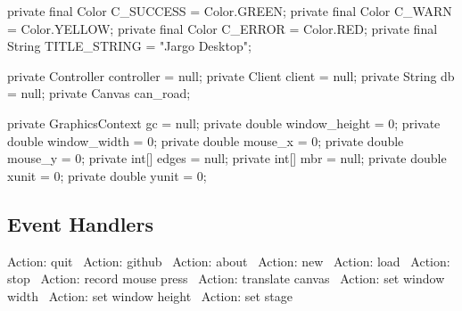 \documentclass{article}
\def\nwendcode{\endtrivlist \endgroup}      %
\let\nwdocspar=\par
\begin{document}
\nwenddocs{}\plusendmoddef
private final Color C_SUCCESS = Color.GREEN;
private final Color C_WARN = Color.YELLOW;
private final Color C_ERROR = Color.RED;
private final String TITLE_STRING = "Jargo Desktop";
\eatline
{}\nwendcode{}\nwdocspar
\nwenddocs{}\plusendmoddef
private Controller controller = null;
private Client client = null;
private String db = null;
private Canvas can_road;
\eatline
{}\nwendcode{}\nwdocspar
\nwenddocs{}\plusendmoddef
private GraphicsContext gc = null;
private double window_height = 0;
private double window_width = 0;
private double mouse_x = 0;
private double mouse_y = 0;
private int[] edges = null;
private int[] mbr = null;
private double xunit = 0;
private double yunit = 0;
\nwendcode{}\nwdocspar

\subsection{Event Handlers}
\nwenddocs{}\endmoddef{}
\LA{}Action: quit~{\nwtagstyle{}}\RA{}
\LA{}Action: github~{\nwtagstyle{}}\RA{}
\LA{}Action: about~{\nwtagstyle{}}\RA{}
\LA{}Action: new~{\nwtagstyle{}}\RA{}
\LA{}Action: load~{\nwtagstyle{}}\RA{}
\LA{}Action: stop~{\nwtagstyle{}}\RA{}
\LA{}Action: record mouse press~{\nwtagstyle{}}\RA{}
\LA{}Action: translate canvas~{\nwtagstyle{}}\RA{}
\LA{}Action: set window width~{\nwtagstyle{}}\RA{}
\LA{}Action: set window height~{\nwtagstyle{}}\RA{}
\LA{}Action: set stage~{\nwtagstyle{}}\RA{}
\nwendcode{}\nwdocspar
\end{document}
